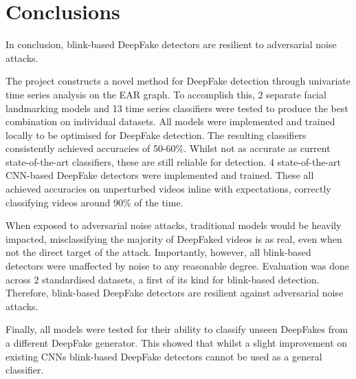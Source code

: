 \chapter{Conclusions}
\label{ch:conclusions}


In conclusion, blink-based DeepFake detectors are resilient to adversarial noise attacks.

The project constructs a novel method for DeepFake detection through univariate time series analysis on the EAR graph. To accomplish this, 2 separate facial landmarking models and 13 time series classifiers were tested to produce the best combination on individual datasets. All models were implemented and trained locally to be optimised for DeepFake detection. The resulting classifiers consistently achieved accuracies of 50-60\%. Whilst not as accurate as current state-of-the-art classifiers, these are still reliable for detection. 4 state-of-the-art CNN-based DeepFake detectors were implemented and trained. These all achieved accuracies on unperturbed videos inline with expectations, correctly classifying videos around 90\% of the time.

When exposed to adversarial noise attacks, traditional models would be heavily impacted, misclassifying the majority of DeepFaked videos is as real, even when not the direct target of the attack. Importantly, however, all blink-based detectors were unaffected by noise to any reasonable degree. Evaluation was done across 2 standardised datasets, a first of its kind for blink-based detection. Therefore, blink-based DeepFake detectors are resilient against adversarial noise attacks.

Finally, all models were tested for their ability to classify unseen DeepFakes from a different DeepFake generator. This showed that whilst a slight improvement on existing CNNs blink-based DeepFake detectors cannot be used as a general classifier.


